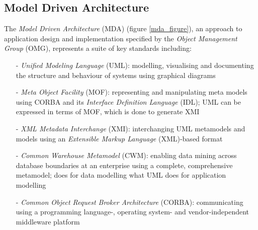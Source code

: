 %
%
%
%
%
%
%

\subsection{Model Driven Architecture}
\label{model_driven_architecture_heading}

The \emph{Model Driven Architecture} (MDA) \cite{mda} (figure \ref{mda_figure}),
an approach to application design and implementation \cite{brown2004} specified
by the \emph{Object Management Group} (OMG), represents a suite of key
standards including:

\begin{itemize}
    \item[-] \emph{Unified Modeling Language} (UML): modelling, visualising and
        documenting the structure and behaviour of systems using graphical
        diagrams
    \item[-] \emph{Meta Object Facility} (MOF): representing and manipulating
        meta models using CORBA and its \emph{Interface Definition Language}
        (IDL); UML can be expressed in terms of MOF, which is done to generate
        XMI
    \item[-] \emph{XML Metadata Interchange} (XMI): interchanging UML
        metamodels and models using an \emph{Extensible Markup Language}
        (XML)-based format
    \item[-] \emph{Common Warehouse Metamodel} (CWM): enabling data mining
        across database boundaries at an enterprise using a complete,
        comprehensive metamodel; does for data modelling what UML does for
        application modelling
    \item[-] \emph{Common Object Request Broker Architecture} (CORBA):
        communicating using a programming language-, operating system- and
        vendor-independent middleware platform
\end{itemize}

